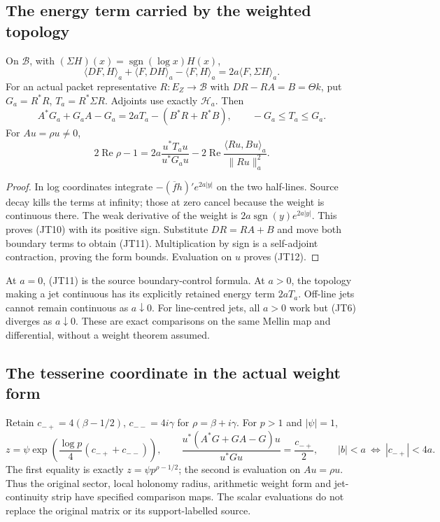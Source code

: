 \subsection{The energy term carried by the weighted topology}
\begin{theorem}
\label{thm:weighted-energy}
On \(\mathscr B\), with \((\Sigma H)(x)=\operatorname{sgn}(\log x)H(x)\),
\[
 \langle DF,H\rangle_a+\langle F,DH\rangle_a-\langle F,H\rangle_a
             =2a\langle F,\Sigma H\rangle_a .
 \tag{JT10}
\]
For an actual packet representative \(R:E_Z\to\mathscr B\) with
\(DR-RA=B=\Theta k\), put \(G_a=R^*R\), \(T_a=R^*\Sigma R\).
Adjoints use exactly \(\mathscr H_a\). Then
\[
 A^*G_a+G_aA-G_a=2aT_a-(B^*R+R^*B),\qquad -G_a\leq T_a\leq G_a.
 \tag{JT11}
\]
For \(Au=\rho u\neq0\),
\[
 2\operatorname{Re}\rho-1
 =2a\frac{u^*T_au}{u^*G_au}
        -2\operatorname{Re}\frac{\langle Ru,Bu\rangle_a}{\|Ru\|_a^2}.
 \tag{JT12}
\]
\end{theorem}
\begin{proof}
In log coordinates integrate
\(-(\overline f h)'e^{2a|y|}\) on the two half-lines.
Source decay kills the terms at infinity; those at zero cancel
because the weight is continuous there. The weak derivative of the
weight is \(2a\operatorname{sgn}(y)e^{2a|y|}\).
This proves (JT10) with its positive sign.
Substitute \(DR=RA+B\) and move both boundary terms to obtain (JT11).
Multiplication by sign is a self-adjoint contraction, proving the
form bounds. Evaluation on \(u\) proves (JT12).
\end{proof}
At \(a=0\), (JT11) is the source boundary-control formula.
At \(a>0\), the topology making a jet continuous has its explicitly
retained energy term \(2aT_a\). Off-line jets cannot remain continuous
as \(a\downarrow0\). For line-centred jets, all \(a>0\) work but
(JT6) diverges as \(a\downarrow0\). These are exact comparisons on the
same Mellin map and differential, without a weight theorem assumed.

\subsection{The tesserine coordinate in the actual weight form}
Retain \(c_{-+}=4(\beta-1/2)\), \(c_{--}=4i\gamma\) for
\(\rho=\beta+i\gamma\). For \(p>1\) and \(|\psi|=1\),
\[
 z=\psi\exp\!\left(\frac{\log p}{4}(c_{-+}+c_{--})\right),\qquad
 \frac{u^*(A^*G+GA-G)u}{u^*Gu}=\frac{c_{-+}}2,\qquad
 |b|<a\ \Longleftrightarrow\ |c_{-+}|<4a .
 \tag{JT13}
\]
The first equality is exactly \(z=\psi p^{\rho-1/2}\);
the second is evaluation on \(Au=\rho u\).
Thus the original sector, local holonomy radius, arithmetic weight form
and jet-continuity strip have specified comparison maps.
The scalar evaluations do not replace the original matrix or its
support-labelled source.
